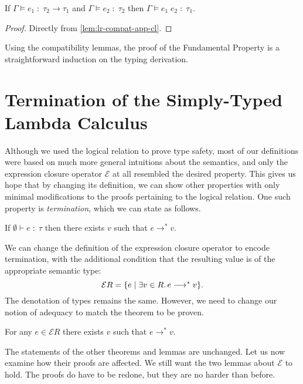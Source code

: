 \begin{lemma}
  If $\Gamma \models e_1 \;:\; \tau_2 \to \tau_1 $
  and $\Gamma \models e_2 \;:\; \tau_2$
  then $\Gamma \models e_1\;e_2 \;:\; \tau_1$.
\end{lemma}
\begin{proof}
  Directly from \autoref{lem:lr-compat-app-cl}.
\end{proof}

Using the compatibility lemmas, the proof of the Fundamental Property is
a straightforward induction on the typing derivation.

\section{Termination of the Simply-Typed Lambda Calculus}

Although we used the logical relation to prove type safety, most of our
definitions were based on much more general intuitions about the semantics, and
only the expression closure operator $\mathcal{E}$ at all resembled the desired
property.
This gives us hope that by changing its definition, we can show other
properties with only minimal modifications to the proofs pertaining to the
logical relation.
One such property is \emph{termination}, which we can state as follows.

\begin{theorem}[Termination]
  If $\emptyset \vdash e \;:\; \tau$ then
  there exists $v$ such that $e \longrightarrow^* v$.
\end{theorem}

We can change the definition of the expression closure operator to encode
termination, with the additional condition that the resulting value is of the
appropriate semantic type:
\[
  \mathcal{E}R = \{ e \mid \exists v \in R\ldotp e \longrightarrow^* v \}.
\]
The denotation of types remains the same. However, we need to change our notion
of adequacy to match the theorem to be proven.

\begin{theorem}[Adequacy]
  For any $e \in \mathcal{E}R$ there exists $v$ such that
  $e \longrightarrow^* v$.
\end{theorem}

The statements of the other theorems and lemmas are unchanged. Let us now
examine how their proofs are affected. We still want the two lemmas about
$\mathcal{E}$ to hold. The proofs do have to be redone, but they are no
harder than before.

